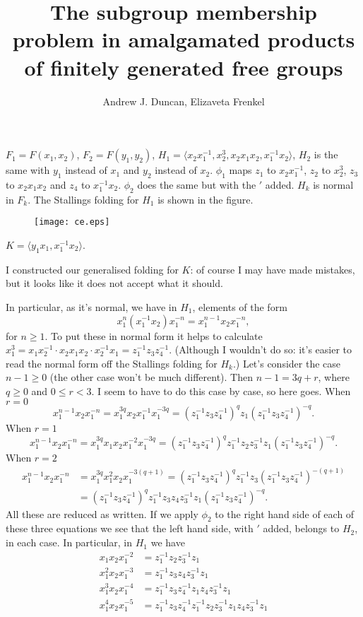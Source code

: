 \documentclass[a4paper,12pt]{article}
\title{The subgroup membership problem in amalgamated products of 
finitely generated free groups
}
\author{Andrew J. Duncan, Elizaveta Frenkel}
\numberwithin{equation}{section}
\numberwithin{figure}{section}
\newcommand{\la}{\langle}
\newcommand{\ra}{\rangle}
\begin{document}
$F_1=F( x_1,x_2)$, $F_2=F(y_1, y_2)$, $H_1=\la x_2x_1^{-1}, x_2^3, x_2x_1x_2,
x_1^{-1}x_2\ra$, $H_2$ is the same with $y_1$ instead of $x_1$ and $y_2$ instead
of $x_2$. $\phi_1$ maps $z_1$ to $  x_2x_1^{-1}$, $z_2$ to $x_2^3$, $z_3$ to 
 $x_2x_1x_2$ and $z_4$ to $x_1^{-1}x_2$. $\phi_2$ does the same but 
with the $'$ added. $H_k$ is normal in $F_k$.
The Stallings folding for $H_1$ is shown in the figure.
\begin{figure}
\begin{center}
\texttt{[image: ce.eps]}
\end{center}
\end{figure}

$K=\la y_1x_1,x_1^{-1}x_2\ra$. 


I constructed our generalised 
folding for $K$: of course I may have made mistakes, but it
looks like it does not accept what it should. 

In particular, as it's normal, we have
in $H_1$, elements of the form
\[
x_1^n (x_1^{-1}x_2)x_1^{-n} = x_1^{n-1}x_2x_1^{-n},\]
for $n\ge 1$.
To put these in normal form it helps to calculate 
$x_1^3=
x_1x_2^{-1}\cdot x_2x_1x_2\cdot x_2^{-1}x_1=z_1^{-1}z_3z_4^{-1}$.
(Although I wouldn't do so: it's easier to read the normal form off the Stallings folding 
for $H_k$.)
Let's consider the case $n-1\ge 0$ (the other case won't be much different).
Then $n-1=3q+r$, where $q\ge 0$ and $0\le r<3$. I seem to have to 
do this case by case, so here goes. When $r=0$
\[x_1^{n-1}x_2x_1^{-n}=x_1^{3q}x_2x_1^{-1}x_1^{-3q}=(z_1^{-1}z_3z_4^{-1})^q z_1 (z_1^{-1}z_3z_4^{-1})^{-q}.\]
 When $r=1$ 
\[
x_1^{n-1}x_2x_1^{-n}=x_1^{3q}x_1x_2x_1^{-2}x_1^{-3q}=(z_1^{-1}z_3z_4^{-1})^q z_1^{-1}z_2 z_3^{-1}z_1
(z_1^{-1}z_3z_4^{-1})^{-q}.
\]
When $r=2$
\begin{align*}
x_1^{n-1}x_2x_1^{-n}&=x_1^{3q}x_1^2x_2x_1^{-3(q+1)}=(z_1^{-1}z_3z_4^{-1})^q z_1^{-1}z_3 
(z_1^{-1}z_3z_4^{-1})^{-(q+1)}\\&=(z_1^{-1}z_3z_4^{-1})^q z_1^{-1}z_3z_4z_3^{-1}z_1 
(z_1^{-1}z_3z_4^{-1})^{-q}.
\end{align*}
All these are reduced as written. 
If we apply $\phi_2$ to the right hand side of each of these three equations we see that 
the left hand side, with $'$ added, belongs to $H_2$, in each case. 
In particular, in $H_1$ we have 
\begin{align*}
x_1x_2x_1^{-2}&=z_1^{-1}z_2z_3^{-1}z_1\\
x_1^2x_2x_1^{-3}&= z_1^{-1}z_3z_4z_3^{-1}z_1\\
x_1^3x_2x_1^{-4}&=  z_1^{-1}z_3z_4^{-1}z_1z_4z_3^{-1}z_1\\
x_1^4x_2x_1^{-5}&= z_1^{-1}z_3z_4^{-1}z_1^{-1}z_2z_3^{-1}z_1z_4z_3^{-1}z_1
\end{align*}
\end{document}
